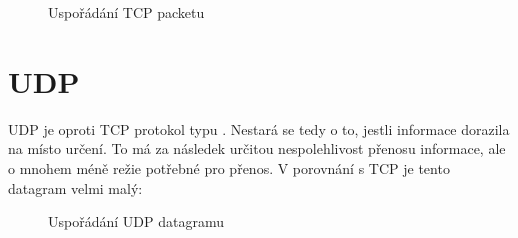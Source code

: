 \begin{figure}[H]
    \centering
	\caption{Uspořádání TCP packetu}
	\label{fig:tcp-packet}
\end{figure}


\section{UDP}
UDP je oproti TCP protokol typu . Nestará se tedy o to, jestli informace dorazila na místo určení. To má za následek určitou nespolehlivost přenosu informace, ale o mnohem méně režie potřebné pro přenos. V porovnání s TCP je tento datagram velmi malý:

\begin{figure}[H]
    \centering
	\caption{Uspořádání UDP datagramu}
	\label{fig:tcp-packet}
\end{figure}

